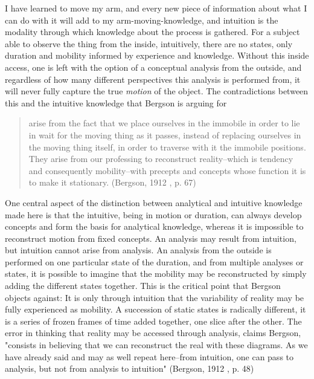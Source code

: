 \documentclass[11pt]{article}
\makeatletter
\newcommand{\cslcitation}[2]
 {\protect\hyper@linkstart{cite}{citeproc_bib_item_#1}#2\hyper@linkend}
\makeatother
\begin{document}
I have learned to move my arm, and every new piece of information about what I can do with it will add to my arm-moving-knowledge, and intuition is the modality through which knowledge about the process is gathered.
For a subject able to observe the thing from the inside, intuitively, there are no states, only duration and mobility informed by experience and knowledge.  
Without this inside access, one is left with the option of a conceptual analysis from the outside, and regardless of how many different perspectives this analysis is performed from, it will never fully capture the true \emph{motion} of the object.
The contradictions between this and the intuitive knowledge that Bergson is arguing for
\begin{quote}
arise from the fact that we place ourselves in the immobile in order to lie in wait for the moving thing as it passes, instead of replacing ourselves in the moving thing itself, in order to traverse with it the immobile positions. They arise from our professing to reconstruct reality--which is tendency and consequently mobility--with precepts and concepts whose function it is to make it stationary. (\cslcitation{2}{Bergson, 1912} , p. 67)
\end{quote}

One central aspect of the distinction between analytical and intuitive knowledge made here is that the intuitive, being in motion or duration, can always develop concepts and form the basis for analytical knowledge, whereas it is impossible to reconstruct motion from fixed concepts.
An analysis may result from intuition, but intuition cannot arise from analysis.
An analysis from the outside is performed on one particular state of the duration, and from multiple analyses or states, it is possible to imagine that the mobility may be reconstructed by simply adding the different states together.
This is the critical point that Bergson objects against:
It is only through intuition that the variability of reality may be fully experienced as mobility.
A succession of static states is radically different, it is a series of frozen frames of time added together, one slice after the other.
The error in thinking that reality may be accessed through analysis, claims Bergson, "consists in believing that we can reconstruct the real with these diagrams. As we have already said and may as well repeat here--from intuition, one can pass to analysis, but not from analysis to intuition" (\cslcitation{2}{Bergson, 1912} , p. 48) 
\end{document}
